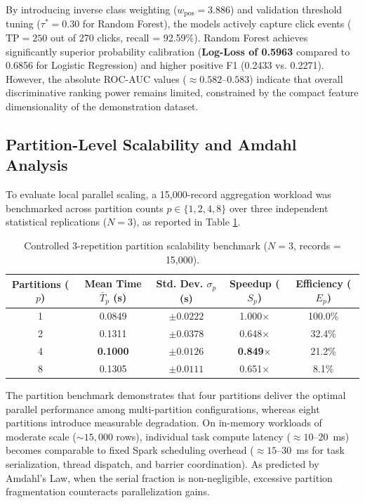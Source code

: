 \documentclass[10pt,a4paper,twoside]{article}
\begin{document}
By introducing inverse class weighting ($w_{\text{pos}} = 3.886$) and validation threshold tuning ($\tau^* = 0.30$ for Random Forest), the models actively capture click events ($\text{TP} = 250$ out of 270 clicks, recall = 92.59\%). Random Forest achieves significantly superior probability calibration (\textbf{Log-Loss of 0.5963} compared to 0.6856 for Logistic Regression) and higher positive F1 (0.2433 vs. 0.2271). However, the absolute ROC-AUC values ($\approx 0.582$--$0.583$) indicate that overall discriminative ranking power remains limited, constrained by the compact feature dimensionality of the demonstration dataset.

\subsection{Partition-Level Scalability and Amdahl Analysis}
To evaluate local parallel scaling, a 15,000-record aggregation workload was benchmarked across partition counts $p \in \{1, 2, 4, 8\}$ over three independent statistical replications ($N = 3$), as reported in Table \ref{tab:partition_perf}.

\begin{table}[ht]
\centering
\small
\caption{Controlled 3-repetition partition scalability benchmark ($N = 3$, records = 15,000).}
\label{tab:partition_perf}
\begin{tabular}{ccccc}
\toprule
\textbf{Partitions ($p$)} & \textbf{Mean Time $\bar{T}_p$ (s)} & \textbf{Std. Dev. $\sigma_p$ (s)} & \textbf{Speedup ($S_p$)} & \textbf{Efficiency ($E_p$)} \\
\midrule
1 & 0.0849 & $\pm 0.0222$ & 1.000$\times$ & 100.0\% \\
2 & 0.1311 & $\pm 0.0378$ & 0.648$\times$ & 32.4\% \\
4 & \textbf{0.1000} & $\pm 0.0126$ & \textbf{0.849$\times$} & 21.2\% \\
8 & 0.1305 & $\pm 0.0111$ & 0.651$\times$ & 8.1\% \\
\bottomrule
\end{tabular}
\end{table}

The partition benchmark demonstrates that four partitions deliver the optimal parallel performance among multi-partition configurations, whereas eight partitions introduce measurable degradation. On in-memory workloads of moderate scale ($\sim 15,000$ rows), individual task compute latency ($\approx 10$--$20$~ms) becomes comparable to fixed Spark scheduling overhead ($\approx 15$--$30$~ms for task serialization, thread dispatch, and barrier coordination). As predicted by Amdahl's Law, when the serial fraction is non-negligible, excessive partition fragmentation counteracts parallelization gains.
\end{document}
